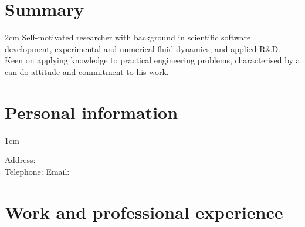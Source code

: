 \documentclass[a4paper,10pt]{article}
\begin{document}
\pagestyle{empty} %

\par{\par\par}

\section{Summary}

\hspace{1cm}
\begin{minipage}{\textwidth}
\begin{adjustwidth}{}{2cm} %
	Self-motivated researcher with background in scientific
		software development, experimental
		and numerical fluid dynamics, and applied R\&D.
	Keen on applying knowledge to practical engineering problems,
		characterised by a can-do attitude and commitment to his work.
\end{adjustwidth}
\end{minipage}

\section{Personal information}

\begin{minipage}{\textwidth}
\begin{adjustwidth}{}{1cm} %

Address: \\
Telephone: \hspace{2cm} Email:

\end{adjustwidth}
\end{minipage}


\section{Work and professional experience}
\end{document}
